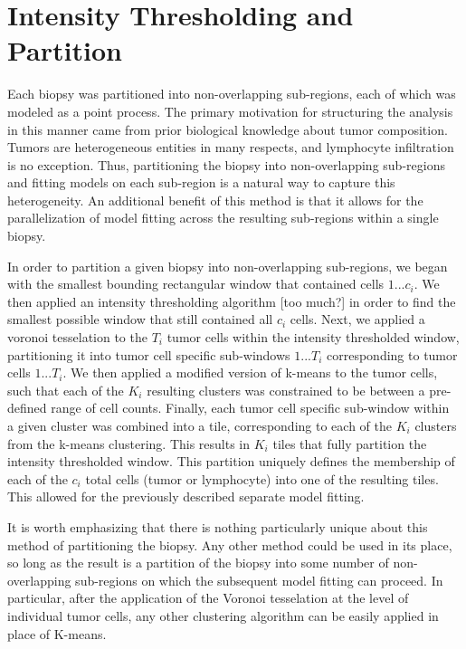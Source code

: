 \documentclass[
]{book}
\begin{document}
\hypertarget{intensity-thresholding-and-partition}{%
\section{Intensity Thresholding and Partition}\label{intensity-thresholding-and-partition}}

Each biopsy was partitioned into non-overlapping sub-regions, each of
which was modeled as a point process. The primary motivation for
structuring the analysis in this manner came from prior biological
knowledge about tumor composition. Tumors are heterogeneous entities in
many respects, and lymphocyte infiltration is no exception. Thus,
partitioning the biopsy into non-overlapping sub-regions and fitting
models on each sub-region is a natural way to capture this
heterogeneity. An additional benefit of this method is that it allows
for the parallelization of model fitting across the resulting
sub-regions within a single biopsy.

In order to partition a given biopsy into non-overlapping sub-regions,
we began with the smallest bounding rectangular window that contained
cells \(1...c_i\). We then applied an intensity thresholding algorithm
{[}too much?{]} in order to find the smallest possible window that still
contained all \(c_i\) cells. Next, we applied a voronoi tesselation to the
\(T_i\) tumor cells within the intensity thresholded window, partitioning
it into tumor cell specific sub-windows \(1...T_i\) corresponding to tumor
cells \(1...T_i\). We then applied a modified version of k-means to the
tumor cells, such that each of the \(K_i\) resulting clusters was
constrained to be between a pre-defined range of cell counts. Finally,
each tumor cell specific sub-window within\\
a given cluster was combined into a tile, corresponding to each of the
\(K_i\) clusters from the k-means clustering. This results in \(K_i\) tiles
that fully partition the intensity thresholded window. This partition
uniquely defines the membership of each of the \(c_i\) total cells (tumor
or lymphocyte) into one of the resulting tiles. This allowed for the
previously described separate model fitting.

It is worth emphasizing that there is nothing particularly unique about
this method of partitioning the biopsy. Any other method could be used
in its place, so long as the result is a partition of the biopsy into
some number of non-overlapping sub-regions on which the subsequent model
fitting can proceed. In particular, after the application of the Voronoi
tesselation at the level of individual tumor cells, any other clustering
algorithm can be easily applied in place of K-means.
\end{document}
